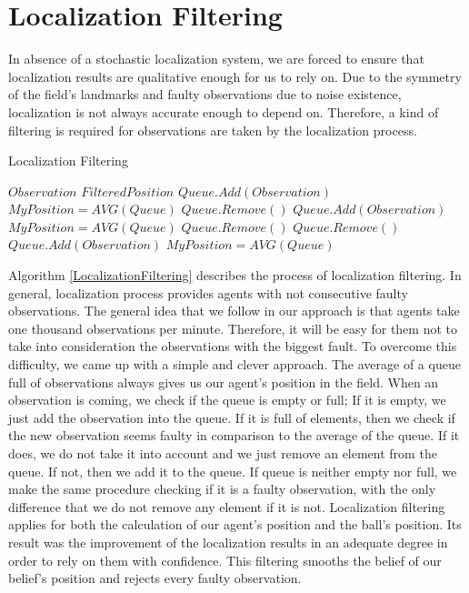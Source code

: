 \section{Localization Filtering}
In absence of a stochastic localization system, we are forced to ensure that localization results are qualitative enough for us to rely on. Due to the symmetry of the field's landmarks and faulty observations due to noise existence, localization is not always accurate enough to depend on. Therefore, a kind of filtering is required for  observations are taken by the localization process.
\begin{algorithm}[ht!]
\caption{Localization Filtering}
\label{LocalizationFiltering}
\begin{algorithmic}[1]
$Observation$
$FilteredPosition$
\STATE $Queue.Add(Observation)$
\STATE $MyPosition = AVG(Queue)$
\STATE $Queue.Remove()$
\ELSE
\STATE $Queue.Add(Observation)$
\STATE $MyPosition = AVG(Queue)$
\ENDIF
\ELSE
{}
\STATE $Queue.Remove()$
\ELSE
\STATE $Queue.Remove()$
\STATE $Queue.Add(Observation)$
\STATE $MyPosition = AVG(Queue)$
\ENDIF
\ENDIF
\end{algorithmic}
\end{algorithm}
Algorithm \ref{LocalizationFiltering} describes the process of localization filtering. In general, localization process provides agents with not consecutive faulty observations. The general idea that we follow in our approach is that agents take one thousand observations per minute. Therefore, it will be easy for them not to take into consideration the observations with the biggest fault. To overcome this difficulty, we came up with a simple and clever approach. The average of a queue full of observations always gives us our agent's position in the field. When an observation is coming, we check if the queue is empty or full; If it is empty, we just add the observation into the queue. If it is full of elements, then we check if the new observation seems faulty in comparison to the average of the queue. If it does, we do not take it into account and we just remove an element from the queue. If not, then we add it to the queue.
If queue is neither empty nor full, we make the same procedure checking if it is a faulty observation, with the only difference that we do not remove any element if it is not. Localization filtering applies for both the calculation of our agent's position and the ball's position. Its result was the improvement of the localization results in an adequate degree in order to rely on them with confidence. This filtering smooths the belief of our belief's position and rejects every faulty observation.


